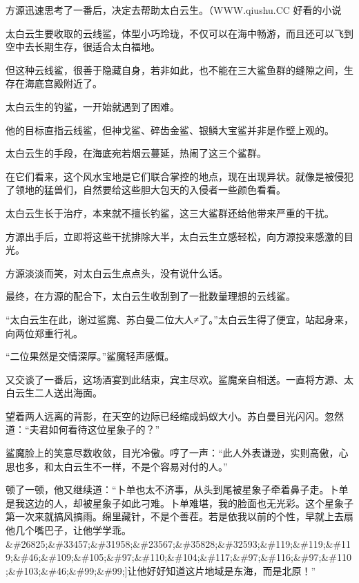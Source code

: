 
\begin{this_body}

方源迅速思考了一番后，决定去帮助太白云生。（WWW.qiushu.CC 好看的小说

太白云生要收取的云线鲨，体型小巧玲珑，不仅可以在海中畅游，而且还可以飞到空中去长期生存，很适合太白福地。

但这种云线鲨，很善于隐藏自身，若非如此，也不能在三大鲨鱼群的缝隙之间，生存在海底宫殿附近了。

太白云生的钓鲨，一开始就遇到了困难。

他的目标直指云线鲨，但神戈鲨、碎齿金鲨、银鳞大宝鲨并非是作壁上观的。

太白云生的手段，在海底宛若烟云蔓延，热闹了这三个鲨群。

在它们看来，这个风水宝地是它们联合掌控的地点，现在出现异状。就像是被侵犯了领地的猛兽们，自然要给这些胆大包天的入侵者一些颜色看看。

太白云生长于治疗，本来就不擅长钓鲨，这三大鲨群还给他带来严重的干扰。

方源出手后，立即将这些干扰排除大半，太白云生立感轻松，向方源投来感激的目光。

方源淡淡而笑，对太白云生点点头，没有说什么话。

最终，在方源的配合下，太白云生收刮到了一批数量理想的云线鲨。

“太白云生在此，谢过鲨魔、苏白曼二位大人≠了。”太白云生得了便宜，站起身来，向两位郑重行礼。

“二位果然是交情深厚。”鲨魔轻声感慨。

又交谈了一番后，这场酒宴到此结束，宾主尽欢。鲨魔亲自相送。一直将方源、太白云生二人送出海面。

望着两人远离的背影，在天空的边际已经缩成蚂蚁大小。苏白曼目光闪闪。忽然道：“夫君如何看待这位星象子的？”

鲨魔脸上的笑意尽数收敛，目光冷傲。哼了一声：“此人外表谦逊，实则高傲，心思也多，和太白云生不一样，不是个容易对付的人。”

顿了一顿，他又继续道：“卜单也太不济事，从头到尾被星象子牵着鼻子走。卜单是我这边的人，却被星象子如此刁难。卜单难堪，我的脸面也无光彩。这个星象子第一次来就搞风搞雨。绵里藏针，不是个善茬。若是依我以前的个性，早就上去扇他几个嘴巴子，让他学学乖。\&\#26825;\&\#33457;\&\#31958;\&\#23567;\&\#35828;\&\#32593;\&\#119;\&\#119;\&\#119;\&\#46;\&\#109;\&\#105;\&\#97;\&\#110;\&\#104;\&\#117;\&\#97;\&\#116;\&\#97;\&\#110;\&\#103;\&\#46;\&\#99;\&\#99;]让他好好知道这片地域是东海，而是北原！”


\end{this_body}
